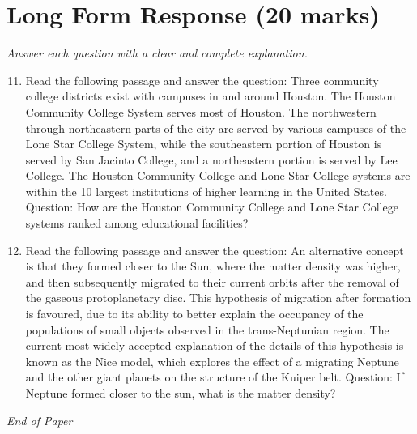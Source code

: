 \documentclass[12pt]{article}
\begin{document}
\section*{Long Form Response (20 marks)}
\textit{Answer each question with a clear and complete explanation.}
\begin{enumerate}[label=\arabic*.]
\setcounter{enumi}{10}
\item Read the following passage and answer the question: Three community college districts exist with campuses in and around Houston. The Houston Community College System serves most of Houston. The northwestern through northeastern parts of the city are served by various campuses of the Lone Star College System, while the southeastern portion of Houston is served by San Jacinto College, and a northeastern portion is served by Lee College. The Houston Community College and Lone Star College systems are within the 10 largest institutions of higher learning in the United States. Question: How are the Houston Community College and Lone Star College systems ranked among educational facilities?
\item Read the following passage and answer the question: An alternative concept is that they formed closer to the Sun, where the matter density was higher, and then subsequently migrated to their current orbits after the removal of the gaseous protoplanetary disc. This hypothesis of migration after formation is favoured, due to its ability to better explain the occupancy of the populations of small objects observed in the trans-Neptunian region. The current most widely accepted explanation of the details of this hypothesis is known as the Nice model, which explores the effect of a migrating Neptune and the other giant planets on the structure of the Kuiper belt. Question: If Neptune formed closer to the sun, what is the matter density?
\end{enumerate}

\vfill
\noindent\textit{End of Paper}
\end{document}
